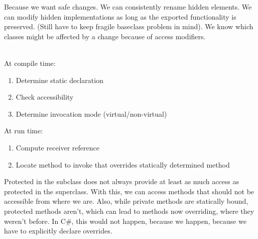 \begin{mytitle} Because we want safe changes. We can consistently rename hidden elements. We can modify hidden implementations as long as the exported functionality is preserved. (Still have to keep fragile baseclass problem in mind). We know which classes might be affected by a change because of access modifiers.
\end{mytitle}
\begin{mytitle}\hfill\\
At compile time:
\begin{enumerate}
    \item Determine static declaration
    \item Check accessibility
    \item Determine invocation mode (virtual/non-virtual)
\end{enumerate}
At run time:
\begin{enumerate}
    \item Compute receiver reference
    \item Locate method to invoke that overrides statically determined method
\end{enumerate}
\end{mytitle}
\begin{mytitle} Protected in the subclass does not always provide at least as much access as protected in the superclass. With this, we can access methods that should not be accessible from where we are. Also, while private methods are statically bound, protected methods aren't, which can lead to methods now overriding, where they weren't before. In C\#, this would not happen, because we happen, because we have to explicitly declare overrides.
\end{mytitle}

